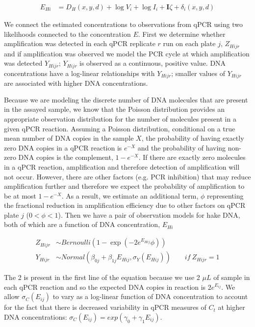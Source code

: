 \documentclass{article}
\begin{document}
\begin{align}
  E_{Hi} &= D_H({x,y,d}) +  \log{V_i} + \log{I_i} + \mathbf{I}\zeta + \delta_i(x,y,d)
\end{align}

We connect the estimated concentrations to observations from qPCR using two likelihoods connected to the concentration $E$. First we determine whether amplification was detected in each qPCR replicate $r$ run on each plate $j$, $Z_{Hijr}$ and if amplification was observed we model the PCR cycle at which amplification was detected $Y_{Hijr}$; $Y_{Hijr}$ is observed as a continuous, positive value. DNA concentrations have a log-linear relationships with $Y_{Hijr}$; smaller values of $Y_{Hijr}$ are associated with higher DNA concentrations. 

Because we are modeling the discrete number of DNA molecules that are present in the assayed sample, we know that the Poisson distribution provides an appropriate observation distribution for the number of molecules present in a given qPCR reaction. Assuming a Poisson distribution, conditional on a true mean number of DNA copies in the sample $X$, the probability of having exactly zero DNA copies in a qPCR reaction is $e^{-X}$ and the probability of having non-zero DNA copies is the complement, $1-e^{-X}$. If there are exactly zero molecules in a qPCR reaction, amplification and therefore detection of amplification will not occur. However, there are other factors (e.g. PCR inhibition) that may reduce amplification further and therefore we expect the probability of amplification to be at most $1-e^{-X}$. As a result, we estimate an additional term, $\phi$ representing the fractional reduction in amplification efficiency due to other factors on qPCR plate $j$ ($0<\phi<1$). Then we have a pair of observation models for hake DNA, both of which are a function of DNA concentration, $E_{Hi}$

\begin{align}
  Z_{Hijr} &\sim Bernoulli\left(1 - \exp(-2 e^{E_{Hij}}\phi) \right) \\ 
  Y_{Hijr} &\sim Normal \left(\beta_{0j}+\beta_{1j}{E_{Hij}},\sigma_Y(E_{Hij}) \right) \qquad  if \: Z_{Hijr} = 1 
\end{align} 

The 2 is present in the first line of the equation because we use 2 $\mu L$ of sample in each qPCR reaction and so the expected DNA copies in reaction is $2e^{E_{ij}}$. We allow $\sigma_C(E_{ij})$ to vary as a log-linear function of DNA concentration to account for the fact that there is decreased variability in qPCR measures of $C_t$ at higher DNA concentrations: $\sigma_C({E_{ij}}) = exp(\gamma_{0}+\gamma_{1}E_{ij})$.
\end{document}
